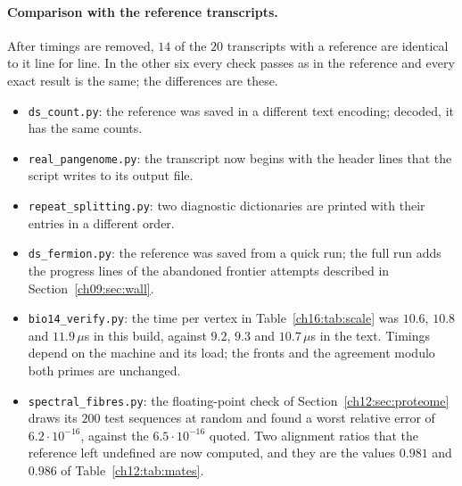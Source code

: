 \paragraph{Comparison with the reference transcripts.} After timings are removed, $14$ of the $20$
transcripts with a reference are identical to it line for line. In the other six every check passes as
in the reference and every exact result is the same; the differences are these.
\begin{itemize}
\item \texttt{ds\_count.py}: the reference was saved in a different text encoding; decoded, it has the
same counts.
\item \texttt{real\_pangenome.py}: the transcript now begins with the header lines that the script
writes to its output file.
\item \texttt{repeat\_splitting.py}: two diagnostic dictionaries are printed with their entries in a
different order.
\item \texttt{ds\_fermion.py}: the reference was saved from a quick run; the full run adds the progress
lines of the abandoned frontier attempts described in Section~\ref{ch09:sec:wall}.
\item \texttt{bio14\_verify.py}: the time per vertex in Table~\ref{ch16:tab:scale} was $10.6$, $10.8$
and $11.9\,\mu$s in this build, against $9.2$, $9.3$ and $10.7\,\mu$s in the text. Timings depend on
the machine and its load; the fronts and the agreement modulo both primes are unchanged.
\item \texttt{spectral\_fibres.py}: the floating-point check of Section~\ref{ch12:sec:proteome} draws
its $200$ test sequences at random and found a worst relative error of $6.2\cdot10^{-16}$, against the
$6.5\cdot10^{-16}$ quoted. Two alignment ratios that the reference left undefined are now computed, and
they are the values $0.981$ and $0.986$ of Table~\ref{ch12:tab:mates}.
\end{itemize}

